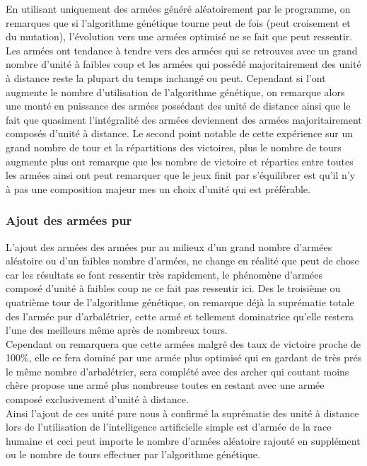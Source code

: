 \documentclass{article}
\begin{document}
		En utilisant uniquement des armées généré aléatoirement par le programme, on remarques que si l'algorithme génétique tourne peut de fois (peut croisement et du mutation), l'évolution vers une armées optimisé ne se fait que peut ressentir. Les armées ont tendance à tendre vers des armées qui se retrouves avec un grand nombre d'unité à faibles coup et les armées qui possédé majoritairement des unité à distance reste la plupart du temps inchangé ou peut. Cependant si l'ont augmente le nombre d'utilisation de l'algorithme génétique, on remarque alors une monté en puissance des armées possédant des unité de distance ainsi que le fait que quasiment l'intégralité des armées deviennent des armées majoritairement composés d'unité à distance. Le second point notable de cette expérience sur un grand nombre de tour et la répartitions des victoires, plus le nombre de tours augmente plus ont remarque que les nombre de victoire et réparties entre toutes les armées ainsi ont peut remarquer que le jeux finit par s'équilibrer est qu'il n'y à pas une composition majeur mes un choix d'unité qui est préférable.
	
	\subsubsection{Ajout des armées pur}
	
		L'ajout des armées des armées pur au milieux d'un grand nombre d'armées aléatoire ou d'un faibles nombre d'armées, ne change en réalité que peut de chose car les résultats se font ressentir très rapidement, le phénomène d'armées composé d'unité à faibles coup ne ce fait pas ressentir ici. Des le troisième ou quatrième tour de l'algorithme génétique, on remarque déjà la suprématie totale des l'armée pur d'arbalétrier, cette armé et tellement dominatrice qu'elle restera l'une des meilleurs même après de nombreux tours. \\
		Cependant on remarquera que cette armées malgré des taux de victoire proche de 100\%, elle ce fera dominé par une armée plus optimisé qui en gardant de très prés le même nombre d'arbalétrier, sera complété avec des archer qui coutant moins chère propose une armé plus nombreuse toutes en restant avec une armée composé exclusivement d'unité à distance.\\
		Ainsi l'ajout de ces unité pure nous à confirmé la suprématie des unité à distance lors de l'utilisation de l'intelligence artificielle simple est d'armée de la race humaine et ceci peut importe le nombre d'armées aléatoire rajouté en supplément ou le nombre de tours effectuer par l'algorithme génétique.
	
\end{document}
